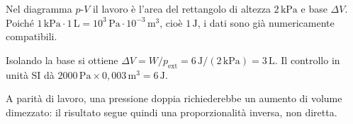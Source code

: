 \documentclass[11pt,a4paper]{article}
\begin{document}
\begin{samepage}
Nel diagramma \(p\)-\(V\) il lavoro è l’area del rettangolo di altezza \(2\,\mathrm{kPa}\) e base \(\Delta V\). Poiché \(1\,\mathrm{kPa}\cdot1\,\mathrm{L}=10^3\,\mathrm{Pa}\cdot10^{-3}\,\mathrm{m^3}\), cioè \(1\,\mathrm{J}\), i dati sono già numericamente compatibili.\par

Isolando la base si ottiene \(\Delta V=W/p_{\mathrm{ext}}=6\,\mathrm{J}/(2\,\mathrm{kPa})=3\,\mathrm{L}\). Il controllo in unità SI dà \(2000\,\mathrm{Pa}\times0{,}003\,\mathrm{m^3}=6\,\mathrm{J}\).\par

A parità di lavoro, una pressione doppia richiederebbe un aumento di volume dimezzato: il risultato segue quindi una proporzionalità inversa, non diretta.\par

\end{samepage}
\newpage
\end{document}
